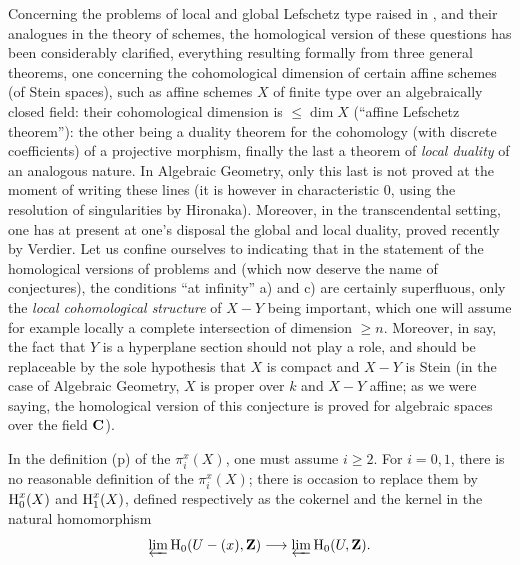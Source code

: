 Concerning the problems of local and global Lefschetz type raised in , and their analogues in the theory of schemes, the homological version of these questions has been considerably clarified, everything resulting formally from three general theorems, one concerning the cohomological dimension of certain affine schemes (\resp of Stein spaces), such as affine schemes $X$ of finite type over an algebraically closed field: their cohomological dimension is $\leq\dim X$ (``affine Lefschetz theorem''): the other being a duality theorem for the cohomology (with discrete coefficients) of a projective morphism, finally the last a theorem of \emph{local duality} of an analogous nature. In Algebraic Geometry, only this last is not proved at the moment of writing these lines (it is however in characteristic $0$, using the resolution of singularities by Hironaka). Moreover, in the transcendental setting, one has at present at one's disposal the global and local duality, proved recently by Verdier. Let us confine ourselves to indicating that in the statement of the homological versions of problems  and  (which now deserve the name of conjectures), the conditions ``at infinity'' a) and c) are certainly superfluous, only the \emph{local cohomological structure} of $X-Y$ being important, which one will assume for example locally a complete intersection of dimension $\geq n$. Moreover, in  say, the fact that $Y$ is a hyperplane section should not play a role, and should be replaceable by the sole hypothesis that $X$ is compact and $X-Y$ is Stein (\ie in the case of Algebraic Geometry, $X$ is proper over $k$ and $X-Y$ affine; as we were saying, the homological version of this conjecture is proved for algebraic spaces over the field $\mathbf{C}$).

\label{p25y}%
In the definition (p\ptbl\pageref{pip15}) of the $\pi_i^x(X)$, one must assume $i\geq 2$. For $i=0, 1$, there is no reasonable definition of the $\pi_i^x(X)$; there is occasion to replace them by $\operatorname{H}_0^x(X)$ and $\operatorname{H}_1^x(X)$, defined respectively as the cokernel and the kernel in the natural homomorphism
$$
\varprojlim \H_0(U-(x), \ZZ)\to\varprojlim\H_0(U, \ZZ).
$$

